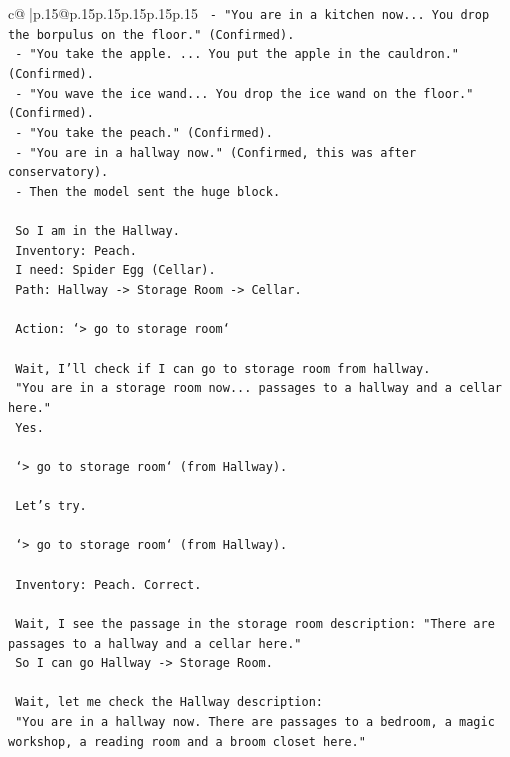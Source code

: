 \documentclass{article}
\begin{document}
{\begin{supertabular}{c@{$\;$}|p{.15\linewidth}@{}p{.15\linewidth}p{.15\linewidth}p{.15\linewidth}p{.15\linewidth}p{.15\linewidth}}
{{{\texttt{    {-} "You are in a kitchen now... You drop the borpulus on the floor." (Confirmed).} \\
\texttt{    {-} "You take the apple. ... You put the apple in the cauldron." (Confirmed).} \\
\texttt{    {-} "You wave the ice wand... You drop the ice wand on the floor." (Confirmed).} \\
\texttt{    {-} "You take the peach." (Confirmed).} \\
\texttt{    {-} "You are in a hallway now." (Confirmed, this was after conservatory).} \\
\texttt{    {-} Then the model sent the huge block.} \\
\\ 
\texttt{    So I am in the Hallway.} \\
\texttt{    Inventory: Peach.} \\
\texttt{    I need: Spider Egg (Cellar).} \\
\texttt{    Path: Hallway {-}> Storage Room {-}> Cellar.} \\
\\ 
\texttt{    Action: `> go to storage room`} \\
\\ 
\texttt{    Wait, I'll check if I can go to storage room from hallway.} \\
\texttt{    "You are in a storage room now... passages to a hallway and a cellar here."} \\
\texttt{    Yes.} \\
\\ 
\texttt{    `> go to storage room` (from Hallway).} \\
\\ 
\texttt{    Let's try.} \\
\\ 
\texttt{    `> go to storage room` (from Hallway).} \\
\\ 
\texttt{    Inventory: Peach. Correct.} \\
\\ 
\texttt{    Wait, I see the passage in the storage room description: "There are passages to a hallway and a cellar here."} \\
\texttt{    So I can go Hallway {-}> Storage Room.} \\
\\ 
\texttt{    Wait, let me check the Hallway description:} \\
\texttt{    "You are in a hallway now. There are passages to a bedroom, a magic workshop, a reading room and a broom closet here."} \\
}}}
\end{supertabular}}
\end{document}
